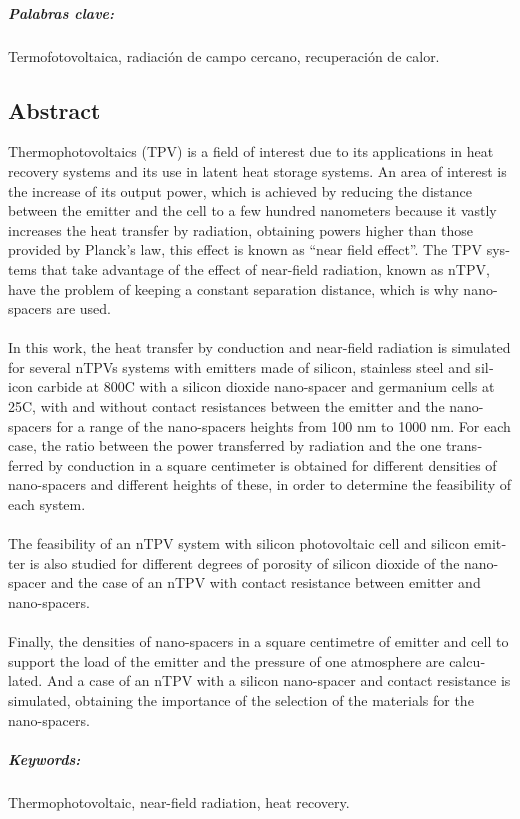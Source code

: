 
\paragraph{Palabras clave:} Termofotovoltaica, radiación de campo cercano, recuperación de calor.
\begin{otherlanguage}{british}
\chapter{Abstract}

Thermophotovoltaics (TPV) is a field of interest due to its applications in heat recovery systems and its use in latent heat storage systems. An area of interest is the increase of its output power, which is achieved by reducing the distance between the emitter and the cell to a few hundred nanometers because it vastly increases the heat transfer by radiation, obtaining powers higher than those provided by Planck's law, this effect is known as ``near field effect''. The TPV systems that take advantage of the effect of near-field radiation, known as nTPV, have the problem of keeping a constant separation distance, which is why nano-spacers are used.\\\\
%
In this work, the heat transfer by conduction and near-field radiation is simulated for several nTPVs systems with emitters made of silicon, stainless steel and silicon carbide at 800\textdegree C with a silicon dioxide nano-spacer and germanium cells at 25\textdegree C, with and without contact resistances between the emitter and the nano-spacers for a range of the nano-spacers heights from 100 nm to 1000 nm. For each case, the ratio between the power transferred by radiation and the one transferred by conduction in a square centimeter is obtained for different densities of nano-spacers and different heights of these, in order to determine the feasibility of each system.\\\\
%
The feasibility of an nTPV system with silicon photovoltaic cell and silicon emitter is also studied for different degrees of porosity of silicon dioxide of the nano-spacer and the case of an nTPV with contact resistance between emitter and nano-spacers.\\\\
%
Finally, the densities of nano-spacers in a square centimetre of emitter and cell to support the load of the emitter and the pressure of one atmosphere are calculated. And a case of an nTPV with a silicon nano-spacer and contact resistance is simulated, obtaining the importance of the selection of the materials for the nano-spacers.

\paragraph{Keywords:} Thermophotovoltaic, near-field radiation, heat recovery.
\end{otherlanguage}